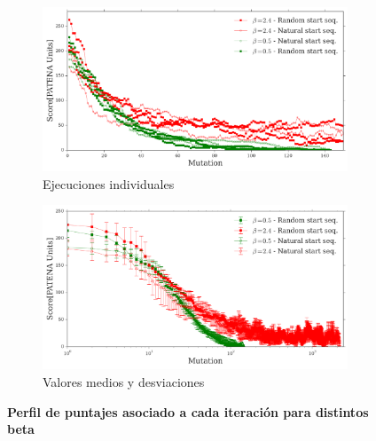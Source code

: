 \begin{figure}[htbp]
  \begin{subfigure}[b]{\textwidth}
 \includegraphics[width=\textwidth]{img/resultados/iterationVsScore-individual.png}
    \caption{Ejecuciones individuales}
    \label{fig:scoreVsiter-a}
  \end{subfigure}
  \begin{subfigure}[b]{\textwidth}
     \includegraphics[width=\textwidth]{img/resultados/iterationVsScore-mean.png}
    \caption{Valores medios y desviaciones}
  \label{fig:scoreVsiter-b}
  \end{subfigure}
  \caption{\textbf{Perfil de puntajes asociado a cada iteración para distintos beta}}
  \label{fig:scoreVsiter}
\end{figure}






